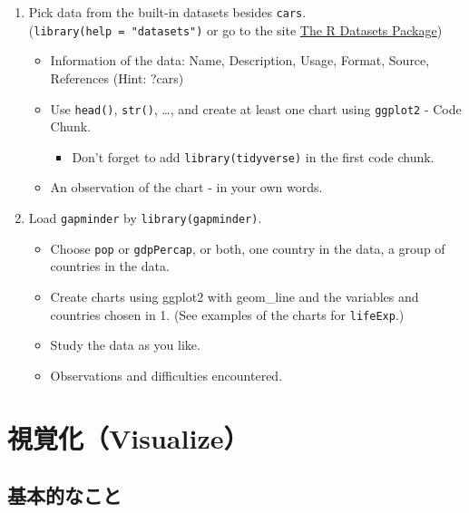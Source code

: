 \documentclass[
  xelatex, ja=standard]{bxjsbook}
\providecommand{\tightlist}{%
  \setlength{\itemsep}{0pt}\setlength{\parskip}{0pt}}
\theoremstyle{definition}
\theoremstyle{definition}
\theoremstyle{definition}
\theoremstyle{definition}
\theoremstyle{remark}
\begin{document}
\begin{enumerate}
\def\labelenumi{\arabic{enumi}.}
\item
  Pick data from the built-in datasets besides \texttt{cars}. (\texttt{library(help\ =\ "datasets")} or go to the site \href{https://stat.ethz.ch/R-manual/R-devel/library/datasets/html/00Index.html}{The R Datasets Package})

  \begin{itemize}
  \tightlist
  \item
    Information of the data: Name, Description, Usage, Format, Source, References (Hint: ?cars)
  \item
    Use \texttt{head()}, \texttt{str()}, \ldots, and create at least one chart using \texttt{ggplot2} - Code Chunk.

    \begin{itemize}
    \tightlist
    \item
      Don't forget to add \texttt{library(tidyverse)} in the first code chunk.
    \end{itemize}
  \item
    An observation of the chart - in your own words.
  \end{itemize}
\item
  Load \texttt{gapminder} by \texttt{library(gapminder)}.

  \begin{itemize}
  \tightlist
  \item
    Choose \texttt{pop} or \texttt{gdpPercap}, or both, one country in the data, a group of countries in the data.
  \item
    Create charts using ggplot2 with geom\_line and the variables and countries chosen in 1. (See examples of the charts for \texttt{lifeExp}.)
  \item
    Study the data as you like.
  \item
    Observations and difficulties encountered.
  \end{itemize}
\end{enumerate}

\hypertarget{visualize}{%
\chapter{視覚化（Visualize）}\label{visualize}}

\hypertarget{ux57faux672cux7684ux306aux3053ux3068}{%
\section{基本的なこと}\label{ux57faux672cux7684ux306aux3053ux3068}}
\end{document}
